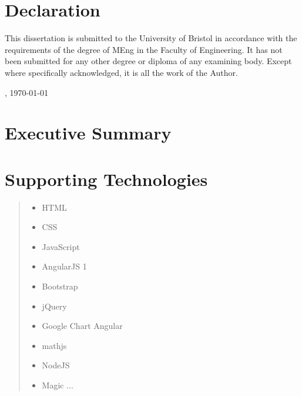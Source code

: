 \documentclass[10pt,a4paper,twoside]{book}
\begin{document}

\cleardoublepage
\pagestyle{plain}


\newpage
  \thispagestyle{plain}

  \chapter*{Declaration}

  This dissertation is submitted to the University of Bristol in accordance 
  with the requirements of the degree of MEng in the Faculty 
  of Engineering.  It has not been submitted for any other degree or diploma 
  of any examining body.  Except where specifically acknowledged, it is all 
  the work of the Author. 

  \vspace{6cm}

  , \today


\tableofcontents




\chapter*{Executive Summary}


\chapter*{Supporting Technologies}

\begin{quote}
\noindent
\begin{itemize}
\item HTML
\item CSS
\item JavaScript
\item AngularJS 1
\item Bootstrap
\item jQuery
\item Google Chart Angular
\item mathjs
\item NodeJS
\item Magic ...
\end{itemize}
\end{quote}
\end{document}

